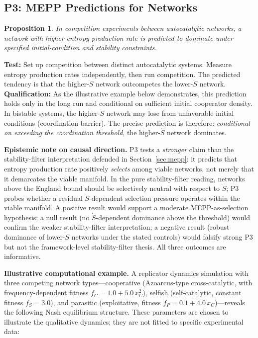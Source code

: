 \documentclass[12pt,a4paper]{article}
\newtheorem{proposition}{Proposition}
\theoremstyle{remark}
\begin{document}
\subsection{P3: MEPP Predictions for Networks}

\begin{proposition}
In competition experiments between autocatalytic networks, a network with higher entropy production rate is predicted to dominate under specified initial-condition and stability constraints.
\end{proposition}

\textbf{Test:} Set up competition between distinct autocatalytic systems. Measure entropy production rates independently, then run competition. The predicted tendency is that the higher-$\dot{S}$ network outcompetes the lower-$\dot{S}$ network. \textbf{Qualification:} As the illustrative example below demonstrates, this prediction holds only in the long run and conditional on sufficient initial cooperator density. In bistable systems, the higher-$\dot{S}$ network may lose from unfavorable initial conditions (coordination barrier). The precise prediction is therefore: \emph{conditional on exceeding the coordination threshold}, the higher-$\dot{S}$ network dominates.

\textbf{Epistemic note on causal direction.} P3 tests a \emph{stronger} claim than the stability-filter interpretation defended in Section~\ref{sec:mepp}: it predicts that entropy production rate positively \emph{selects} among viable networks, not merely that it demarcates the viable manifold. In the pure stability-filter reading, networks above the England bound should be selectively neutral with respect to $\dot{S}$; P3 probes whether a residual $\dot{S}$-dependent selection pressure operates within the viable manifold. A positive result would support a moderate MEPP-as-selection hypothesis; a null result (no $\dot{S}$-dependent dominance above the threshold) would confirm the weaker stability-filter interpretation; a negative result (robust dominance of lower-$\dot{S}$ networks under the stated controls) would falsify strong P3 but not the framework-level stability-filter thesis. All three outcomes are informative.

\textbf{Illustrative computational example.} A replicator dynamics simulation with three competing network types---cooperative (Azoarcus-type cross-catalytic, with frequency-dependent fitness $f_C = 1.0 + 5.0\,x_C^2$), selfish (self-catalytic, constant fitness $f_S = 3.0$), and parasitic (exploitative, fitness $f_P = 0.1 + 4.0\,x_C$)---reveals the following Nash equilibrium structure. These parameters are chosen to illustrate the qualitative dynamics; they are not fitted to specific experimental data:
\end{document}

